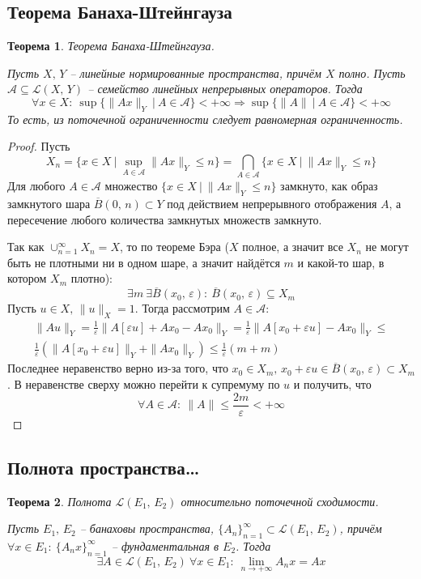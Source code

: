 \documentclass[a4paper,12pt]{article}
\renewcommand{\leq}{\ensuremath{\leqslant}}
\theoremstyle{plain}
\newtheorem{theorem}{Теорема}[section]
\theoremstyle{definition}
\theoremstyle{remark}
\begin{document}
\subsection{Теорема Банаха-Штейнгауза}
\begin{theorem}
	Теорема Банаха-Штейнгауза.

	Пусть $X,\,Y$ -- линейные нормированные пространства, причём $X$ полно. Пусть $\mathcal{A} \subseteq \mathcal{L}(X,\, Y)$ -- семейство линейных непрерывных операторов. Тогда
	\[
		\forall x \in X :\: \sup \{\|Ax\|_Y \:\vert\: A \in \mathcal{A}\} < +\infty \Rightarrow \sup\{\|A\| \:\vert\: A \in \mathcal{A}\} < +\infty
	\]
	То есть, из поточечной ограниченности следует равномерная ограниченность.
\end{theorem}

\begin{proof}
	Пусть
	\[
		X_n = \{x \in X \:\vert\: \sup_{A \in \mathcal{A}} \|Ax\|_Y \leq n\} = \bigcap_{A \in \mathcal{A}} \{x \in X \:\vert\: \|Ax\|_Y \leq n\}
	\]
	Для любого $A \in \mathcal{A}$ множество $\{x \in X \:\vert\: \|Ax\|_Y \leq n\}$ замкнуто, как образ замкнутого шара $\overline{B}(0,\,n) \subset Y$ под действием непрерывного отображения $A$, а пересечение любого количества замкнутых множеств замкнуто.

	Так как $\cup_{n = 1}^\infty X_n = X$, то по теореме Бэра ($X$ полное, а значит все $X_n$ не могут быть не плотными ни в одном шаре, а значит найдётся $m$ и какой-то шар, в котором $X_m$ плотно):
	\[
		\exists m \: \exists \overline{B}(x_0,\,\varepsilon) :\: \overline{B}(x_0,\, \varepsilon) \subseteq X_m
	\]
	Пусть $u \in X,\, \|u\|_X = 1$. Тогда рассмотрим $A \in \mathcal{A}$:
	\begin{align*}
		\|Au\|_Y = \frac{1}{\varepsilon}\|A[\varepsilon u] + Ax_0 - Ax_0\|_Y = \frac{1}{\varepsilon}\|A[x_0 + \varepsilon u] - Ax_0\|_Y \leq \\
		\frac{1}{\varepsilon}\left(\|A[x_0 + \varepsilon u]\|_Y + \|Ax_0\|_Y\right) \leq \frac{1}{\varepsilon}(m + m)
	\end{align*}
	Последнее неравенство верно из-за того, что $x_0 \in X_m,\, x_0 + \varepsilon u \in \overline{B}(x_0,\,\varepsilon) \subset X_m$. В неравенстве сверху можно перейти к супремуму по $u$ и получить, что
	\[
		\forall A \in \mathcal{A} :\: \|A\| \leq \frac{2m}{\varepsilon} < +\infty
	\]
\end{proof}

\subsection{Полнота пространства\dots}
\begin{theorem}
	Полнота $\mathcal{L}(E_1,\, E_2)$ относительно поточечной сходимости.

	Пусть $E_1,\, E_2$ -- банаховы пространства, $\{A_n\}_{n=1}^\infty \subset \mathcal{L}(E_1,\, E_2)$, причём $\forall x \in E_1 :\: \{A_nx\}_{n=1}^\infty$ -- фундаментальная в $E_2$. Тогда
	\[
		\exists A \in \mathcal{L}(E_1,\, E_2) \: \forall x \in E_1 :\: \lim_{n \to +\infty} A_nx = Ax
	\]
\end{theorem}
\end{document}
